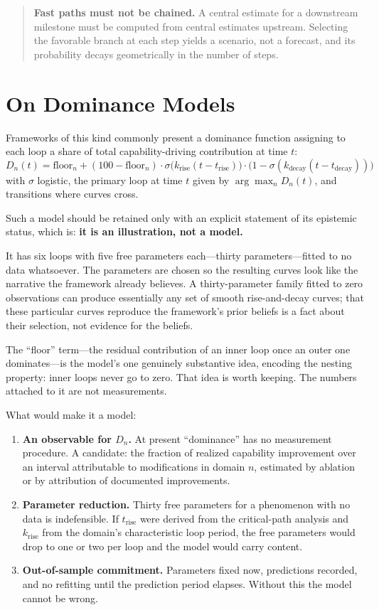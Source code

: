 \documentclass[11pt]{article}
\begin{document}
\begin{quote}
\textbf{Fast paths must not be chained.} A central estimate for a downstream milestone must be computed from central estimates upstream. Selecting the favorable branch at each step yields a scenario, not a forecast, and its probability decays geometrically in the number of steps.
\end{quote}

\section{On Dominance Models}
\label{sec:dominance}

Frameworks of this kind commonly present a dominance function assigning to each loop a share of total capability-driving contribution at time $t$:
\[
D_n(t) = \mathrm{floor}_n + (100 - \mathrm{floor}_n)\cdot\sigma\big(k_{\mathrm{rise}}(t - t_{\mathrm{rise}})\big)\cdot\big(1 - \sigma(k_{\mathrm{decay}}(t - t_{\mathrm{decay}}))\big)
\]
with $\sigma$ logistic, the primary loop at time $t$ given by $\arg\max_n D_n(t)$, and transitions where curves cross.

Such a model should be retained only with an explicit statement of its epistemic status, which is: \textbf{it is an illustration, not a model.}

It has six loops with five free parameters each---thirty parameters---fitted to no data whatsoever. The parameters are chosen so the resulting curves look like the narrative the framework already believes. A thirty-parameter family fitted to zero observations can produce essentially any set of smooth rise-and-decay curves; that these particular curves reproduce the framework's prior beliefs is a fact about their selection, not evidence for the beliefs.

The ``floor'' term---the residual contribution of an inner loop once an outer one dominates---is the model's one genuinely substantive idea, encoding the nesting property: inner loops never go to zero. That idea is worth keeping. The numbers attached to it are not measurements.

What would make it a model:

\begin{enumerate}
\item \textbf{An observable for $D_n$.} At present ``dominance'' has no measurement procedure. A candidate: the fraction of realized capability improvement over an interval attributable to modifications in domain $n$, estimated by ablation or by attribution of documented improvements.
\item \textbf{Parameter reduction.} Thirty free parameters for a phenomenon with no data is indefensible. If $t_{\mathrm{rise}}$ were derived from the critical-path analysis and $k_{\mathrm{rise}}$ from the domain's characteristic loop period, the free parameters would drop to one or two per loop and the model would carry content.
\item \textbf{Out-of-sample commitment.} Parameters fixed now, predictions recorded, and no refitting until the prediction period elapses. Without this the model cannot be wrong.
\end{enumerate}
\end{document}
